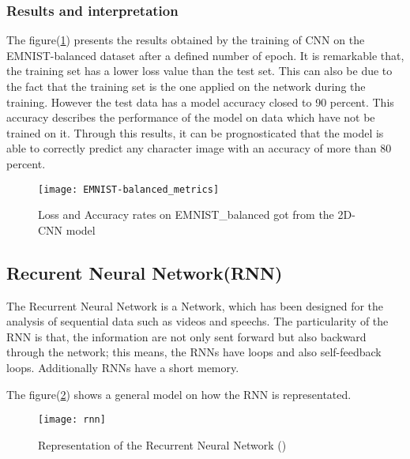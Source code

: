 \subsubsection{Results and interpretation}
The figure(\ref{Abb:emnist_balaced_metrics}) presents the results obtained by the training of CNN on the 
EMNIST-balanced dataset after a defined number of epoch.
It is remarkable that, the training set has a lower loss value than the test set.
This can also be due to the fact that the training set is the one applied on the network during the training. 
However the test data has a model accuracy closed to 90 percent.  
This accuracy describes the performance of the model on data which have not be trained on it.
Through this results, it can be prognosticated that the model is able to correctly predict any character image
with an accuracy of more than 80 percent. 

\begin{figure}[htb]
	\centering
	\texttt{[image: EMNIST-balanced\_metrics]}
	\caption[Results of DFFNN training on MNIST]{Loss and Accuracy rates on EMNIST\_balanced got from the 2D-CNN model} \label{Abb:emnist_balaced_metrics}
\end{figure}



\subsection{Recurent Neural Network(RNN)}
The Recurrent Neural Network is a Network, which has been designed for the analysis of sequential data such as 
videos and speechs. 
The particularity of the RNN is that, the information are not only sent forward but also backward 
through the network; this means, the RNNs have loops and also self-feedback loops.
Additionally RNNs have a short memory. 

The figure(\ref{Abb:schema_rnn}) shows a general model on how the RNN is representated.

\begin{figure}[htb]
	\centering
	\texttt{[image: rnn]}
	\caption[Schema Recurrent Neural Network]{Representation of the Recurrent Neural Network (\cite{[1]})} \label{Abb:schema_rnn}
\end{figure}

